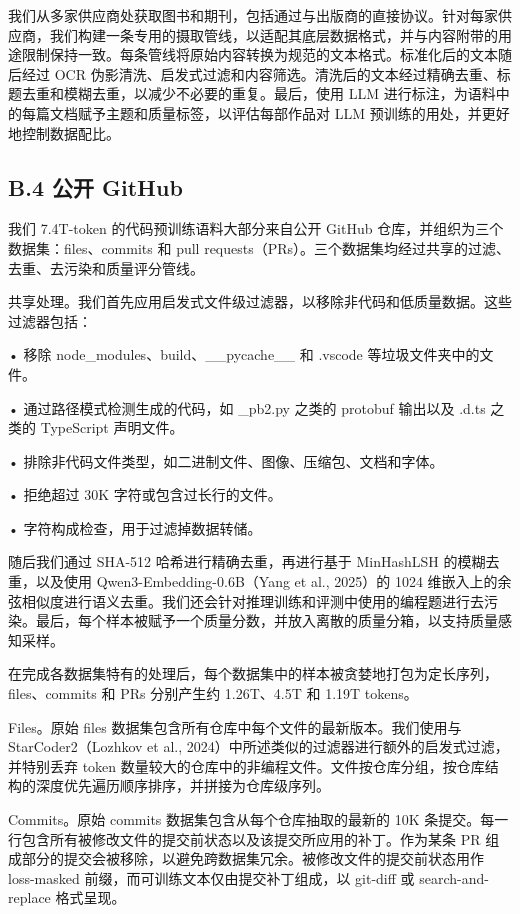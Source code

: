 我们从多家供应商处获取图书和期刊，包括通过与出版商的直接协议。针对每家供应商，我们构建一条专用的摄取管线，以适配其底层数据格式，并与内容附带的用途限制保持一致。每条管线将原始内容转换为规范的文本格式。标准化后的文本随后经过 OCR 伪影清洗、启发式过滤和内容筛选。清洗后的文本经过精确去重、标题去重和模糊去重，以减少不必要的重复。最后，使用 LLM 进行标注，为语料中的每篇文档赋予主题和质量标签，以评估每部作品对 LLM 预训练的用处，并更好地控制数据配比。

\subsection{B.4 公开 GitHub}\label{b.4-public-github}

我们 7.4T-token 的代码预训练语料大部分来自公开 GitHub 仓库，并组织为三个数据集：files、commits 和 pull requests（PRs）。三个数据集均经过共享的过滤、去重、去污染和质量评分管线。

共享处理。我们首先应用启发式文件级过滤器，以移除非代码和低质量数据。这些过滤器包括：

• 移除 node\_modules、build、\_\_pycache\_\_ 和 .vscode 等垃圾文件夹中的文件。

• 通过路径模式检测生成的代码，如 \_pb2.py 之类的 protobuf 输出以及 .d.ts 之类的 TypeScript 声明文件。

• 排除非代码文件类型，如二进制文件、图像、压缩包、文档和字体。

• 拒绝超过 30K 字符或包含过长行的文件。

• 字符构成检查，用于过滤掉数据转储。

随后我们通过 SHA-512 哈希进行精确去重，再进行基于 MinHashLSH 的模糊去重，以及使用 Qwen3-Embedding-0.6B（Yang et al., 2025）的 1024 维嵌入上的余弦相似度进行语义去重。我们还会针对推理训练和评测中使用的编程题进行去污染。最后，每个样本被赋予一个质量分数，并放入离散的质量分箱，以支持质量感知采样。

在完成各数据集特有的处理后，每个数据集中的样本被贪婪地打包为定长序列，files、commits 和 PRs 分别产生约 1.26T、4.5T 和 1.19T tokens。

Files。原始 files 数据集包含所有仓库中每个文件的最新版本。我们使用与 StarCoder2（Lozhkov et al., 2024）中所述类似的过滤器进行额外的启发式过滤，并特别丢弃 token 数量较大的仓库中的非编程文件。文件按仓库分组，按仓库结构的深度优先遍历顺序排序，并拼接为仓库级序列。

Commits。原始 commits 数据集包含从每个仓库抽取的最新的 10K 条提交。每一行包含所有被修改文件的提交前状态以及该提交所应用的补丁。作为某条 PR 组成部分的提交会被移除，以避免跨数据集冗余。被修改文件的提交前状态用作 loss-masked 前缀，而可训练文本仅由提交补丁组成，以 git-diff 或 search-and-replace 格式呈现。

